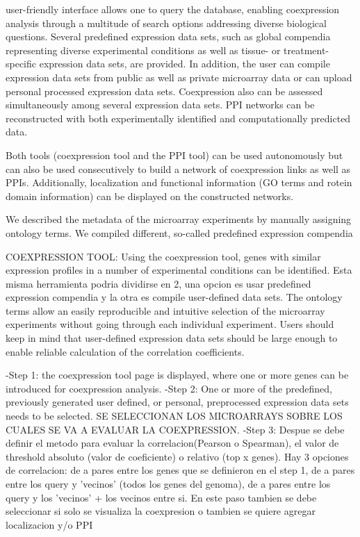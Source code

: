 \documentclass[a4paper,10pt]{article}
\begin{document}
\begin{itemize}
user-friendly interface allows one to query the database, enabling coexpression analysis through a multitude of search options addressing diverse biological questions.
Several predefined expression data sets, such as global compendia representing diverse experimental conditions as well as tissue- or treatment- specific expression data sets, are provided. In addition, the user can compile expression data sets from public as well as private microarray data or can upload personal processed expression data sets.
Coexpression also can be assessed simultaneously among several expression data sets.
PPI networks can be reconstructed with both experimentally identified and computationally predicted data.


Both tools (coexpression tool and the PPI tool) can be used autonomously but can also be used consecutively to build a network of coexpression links as well as PPIs. 
Additionally, localization and functional information (GO terms and rotein domain information) can be displayed on the constructed networks.

We described the metadata of the microarray experiments by manually assigning ontology terms.
We compiled different, so-called predefined expression compendia


COEXPRESSION TOOL:
Using the coexpression tool, genes with similar expression profiles in a number of experimental conditions can be identified.
Esta misma herramienta podria dividirse en 2, una opcion es usar predefined expression compendia y la otra es compile user-defined data sets.
The ontology terms allow an easily reproducible and intuitive selection of the microarray experiments without going through each individual experiment. Users should keep in mind that user-defined expression data sets should be large enough to enable reliable calculation of the correlation coefficients.

-Step 1: the coexpression tool page is displayed, where one or more genes can be introduced for coexpression analysis.
-Step 2: One or more of the predefined, previously generated user defined, or personal, preprocessed expression data sets needs to be selected. SE SELECCIONAN LOS MICROARRAYS SOBRE LOS CUALES SE VA A EVALUAR LA COEXPRESSION.
-Step 3: Despue se debe definir el metodo para evaluar la correlacion(Pearson o Spearman), el valor de threshold absoluto (valor de coeficiente) o relativo (top x genes).
Hay 3 opciones de correlacion: de a pares entre los genes que se definieron en el step 1, de a pares entre los query y 'vecinos' (todos los genes del genoma), 
de a pares entre los query y los 'vecinos' + los vecinos entre si.
En este paso tambien se debe seleccionar si solo se visualiza la coexpresion o tambien se quiere agregar localizacion y/o PPI


\end{itemize}
\end{document}
